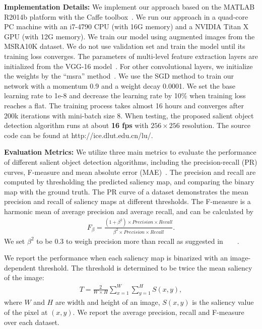\documentclass[10pt,twocolumn,letterpaper]{article}
\begin{document}
\textbf{Implementation Details:}
We implement our approach based on the MATLAB R2014b platform with the Caffe toolbox~\cite{jia2014caffe}.
%
We run our approach in a quad-core PC machine with an i7-4790 CPU (with 16G memory) and a NVIDIA Titan X GPU (with 12G memory).
%
We train our model using augmented images from the MSRA10K dataset. We do not use validation set and train the model
until its training loss converges.
%
The parameters of multi-level feature extraction layers are initialized from the VGG-16 model~\cite{simonyan2014very}.
%
For other convolutional layers, we initialize the weights by the ``msra'' method~\cite{He2015Delving}.
%
We use the SGD method to train our network with a momentum 0.9 and a weight decay 0.0001.
%
We set the base learning rate to 1e-8 and decrease the learning rate by 10\% when training loss reaches a flat.
%
The training process takes almost 16 hours and converges after 200k iterations with mini-batch size 8.
%
When testing, the proposed salient object detection algorithm runs at about \textbf{16 fps} with $256\times256$ resolution.
%
The source code can be found at \textcolor[rgb]{1,0,0}{http://ice.dlut.edu.cn/lu/}.

\textbf{Evaluation Metrics:}
We utilize three main metrics to evaluate the performance of different salient object detection algorithms, including the precision-recall (PR) curves, F-measure and mean absolute error (MAE)~\cite{borji2015salient}.
%
The precision and recall are computed by thresholding the predicted saliency map, and comparing the binary map with the ground truth.
%
The PR curve of a dataset demonstrates the mean precision and recall of saliency maps at different thresholds.
%
The F-measure is a harmonic mean of average precision and average recall, and can be calculated by
\vspace{-0.5mm}
\begin{align}
  F_{\beta} =\frac{(1+\beta^2)\times Precision\times Recall}{\beta^2\times Precision \times Recall}.
    \label{equ:equ19}
\end{align}
\vspace{-0.5mm}
We set $\beta^2$ to be 0.3 to weigh precision more than recall as suggested in~\cite{yan2013hierarchical}~\cite{wang2015deep}~\cite{borji2015salient}~\cite{yang2013saliency}.

We report the performance when each saliency map is binarized with an image-dependent threshold.
%
The threshold is determined to be twice the mean saliency of the image:
\begin{align}
T = \frac{2}{W\times H}\sum_{x=1}^{W}\sum_{y=1}^{H}S(x,y),
  \label{equ:equ3}
\end{align}
where $W$ and $H$ are width and height of an image, $S(x,y)$ is the saliency value of the pixel at
$(x,y)$. We report the average precision, recall and F-measure over each dataset.
\end{document}
